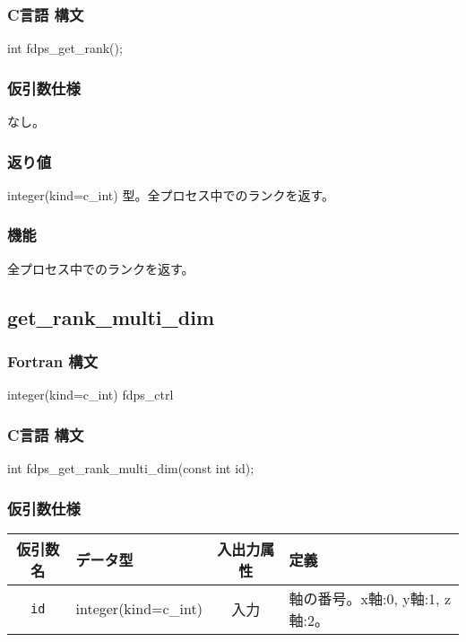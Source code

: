 \subsubsection*{C言語 構文}
\begin{screen}
\begin{spverbatim}
int fdps_get_rank();
\end{spverbatim}
\end{screen}

\subsubsection*{仮引数仕様}
なし。

\subsubsection*{返り値}
integer(kind=c\_int) 型。全プロセス中でのランクを返す。

\subsubsection*{機能}
全プロセス中でのランクを返す。
\clearpage

\subsection{get\_rank\_multi\_dim}
\subsubsection*{Fortran 構文}
\begin{screen}
\begin{spverbatim}  
integer(kind=c_int) fdps_ctrl%
\end{spverbatim}
\end{screen}

\subsubsection*{C言語 構文}
\begin{screen}
\begin{spverbatim}  
int fdps_get_rank_multi_dim(const int id);
\end{spverbatim}
\end{screen}

\subsubsection*{仮引数仕様}
\begin{table}[h]
\begin{tabularx}{\linewidth}{cXcX}
\toprule
\rowcolor{Snow2}
仮引数名 & データ型 & 入出力属性 & 定義 \\
\midrule
\verb|id| & integer(kind=c\_int) & 入力 & 軸の番号。x軸:0, y軸:1, z軸:2。\\
\bottomrule
\end{tabularx}
\end{table}

